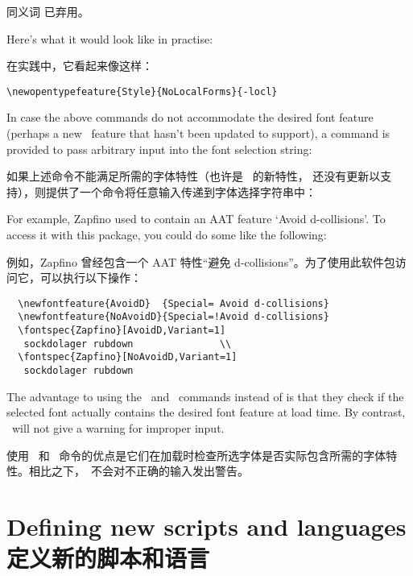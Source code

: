 \documentclass[a4paper]{l3doc}
\begin{document}
同义词  已弃用。

Here's what it would look like in practise:

在实践中，它看起来像这样：

\begin{Verbatim}
\newopentypefeature{Style}{NoLocalForms}{-locl}
\end{Verbatim}

\DescribeMacro{\newfontfeature}
In case the above commands do not accommodate the desired font feature
(perhaps a new \XeTeX\ feature that  hasn't been updated
to support), a command is provided to pass arbitrary input into the
font selection string:\par
如果上述命令不能满足所需的字体特性（也许是 \XeTeX\ 的新特性， 还没有更新以支持），则提供了一个命令将任意输入传递到字体选择字符串中：\par
{\centering\cmd{\newfontfeature}\par}

For example, Zapfino used to
contain an AAT feature `Avoid d-collisions'. To access it
with this package, you could do some like the following:

例如，Zapfino 曾经包含一个 AAT 特性“避免 d-collisions”。为了使用此软件包访问它，可以执行以下操作：

\begin{Verbatim}
  \newfontfeature{AvoidD}  {Special= Avoid d-collisions}
  \newfontfeature{NoAvoidD}{Special=!Avoid d-collisions}
  \fontspec{Zapfino}[AvoidD,Variant=1]
   sockdolager rubdown               \\
  \fontspec{Zapfino}[NoAvoidD,Variant=1]
   sockdolager rubdown
\end{Verbatim}

The advantage to using the \cmd\newAATfeature\ and \cmd\newopentypefeature\
commands instead of  is that they check if the selected font actually contains the desired font
feature at load time. By contrast, \cmd\newfontfeature\ will not give a warning
for improper input.

使用 \cmd\newAATfeature\ 和 \cmd\newopentypefeature\ 命令的优点是它们在加载时检查所选字体是否实际包含所需的字体特性。相比之下，\cmd\newfontfeature\ 不会对不正确的输入发出警告。

\section{Defining new scripts and languages\\定义新的脚本和语言}
\label{sec:newscriptlang}
\end{document}
